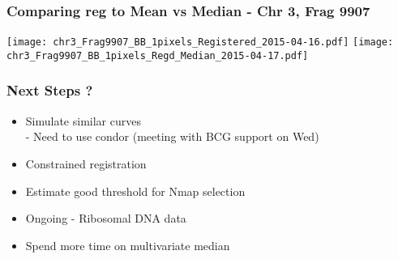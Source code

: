 \documentclass[10pt,dvipsnames,table]{beamer}
\begin{document}
\begin{frame}
\frametitle{Comparing reg to Mean vs Median - Chr 3, Frag 9907}
\begin{center}
\texttt{[image: chr3\_Frag9907\_BB\_1pixels\_Registered\_2015-04-16.pdf]}
\texttt{[image: chr3\_Frag9907\_BB\_1pixels\_Regd\_Median\_2015-04-17.pdf]}
\end{center}
\end{frame}

\begin{frame}
\frametitle{Next Steps ?}
\begin{itemize}
\item Simulate similar curves \\
- Need to use condor (meeting with BCG support on Wed)
\item Constrained registration
\item Estimate good threshold for Nmap selection
\item Ongoing - Ribosomal DNA data
\item Spend more time on multivariate median
\end{itemize}
\end{frame}
\end{document}
